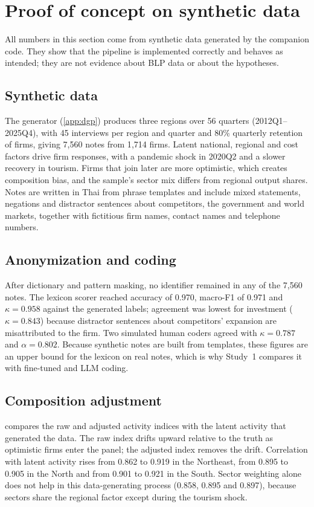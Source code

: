 \documentclass[11pt]{article}
\begin{document}
\section{Proof of concept on synthetic data}\label{sec:poc}

All numbers in this section come from synthetic data generated by the companion code. They show that the pipeline is implemented correctly and behaves as intended; they are not evidence about BLP data or about the hypotheses.

\subsection{Synthetic data}
The generator (\cref{app:dgp}) produces three regions over 56 quarters (2012Q1--2025Q4), with 45 interviews per region and quarter and 80\% quarterly retention of firms, giving 7{,}560 notes from 1{,}714 firms. Latent national, regional and cost factors drive firm responses, with a pandemic shock in 2020Q2 and a slower recovery in tourism. Firms that join later are more optimistic, which creates composition bias, and the sample's sector mix differs from regional output shares. Notes are written in Thai from phrase templates and include mixed statements, negations and distractor sentences about competitors, the government and world markets, together with fictitious firm names, contact names and telephone numbers.

\subsection{Anonymization and coding}
After dictionary and pattern masking, no identifier remained in any of the 7{,}560 notes. The lexicon scorer reached accuracy of 0.970, macro-F1 of 0.971 and $\kappa = 0.958$ against the generated labels; agreement was lowest for investment ($\kappa = 0.843$) because distractor sentences about competitors' expansion are misattributed to the firm. Two simulated human coders agreed with $\kappa = 0.787$ and $\alpha = 0.802$. Because synthetic notes are built from templates, these figures are an upper bound for the lexicon on real notes, which is why Study~1 compares it with fine-tuned and LLM coding.

\subsection{Composition adjustment}
 compares the raw and adjusted activity indices with the latent activity that generated the data. The raw index drifts upward relative to the truth as optimistic firms enter the panel; the adjusted index removes the drift. Correlation with latent activity rises from 0.862 to 0.919 in the Northeast, from 0.895 to 0.905 in the North and from 0.901 to 0.921 in the South. Sector weighting alone does not help in this data-generating process (0.858, 0.895 and 0.897), because sectors share the regional factor except during the tourism shock.
\end{document}
